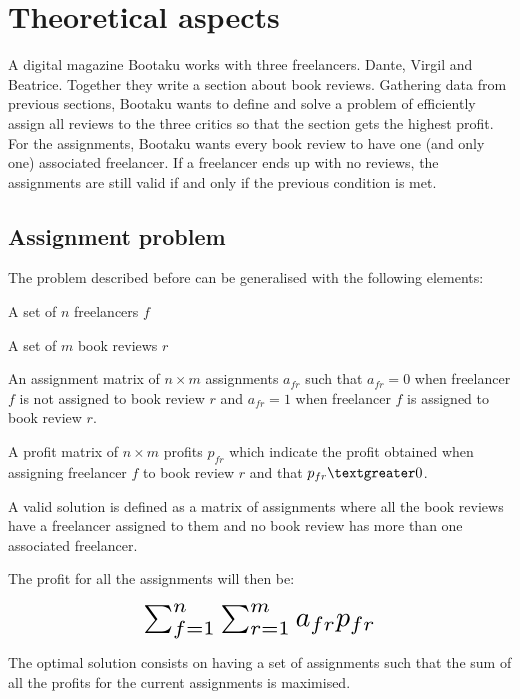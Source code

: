 \renewcommand{\documentname}{Theoretical Aspects}

\chapter{Theoretical aspects}\label{theory}

A digital magazine Bootaku works with three freelancers. Dante, Virgil and Beatrice. Together they write a section about book reviews. Gathering data from previous sections, Bootaku wants to define and solve a problem of efficiently assign all reviews to the three critics so that the section gets the highest profit. For the assignments, Bootaku wants every book review to have one (and only one) associated freelancer. If a freelancer ends up with no reviews, the assignments are still valid if and only if the previous condition is met.


\section{Assignment problem}

The problem described before can be generalised with the following elements: 

\begin{description}
    \item A set of $n$ freelancers $f$
    \item A set of $m$ book reviews $r$
    \item An assignment matrix of $n \times m$ assignments $a_{fr}$ such that $a_{fr} = 0$ when freelancer $f$ is not assigned to book review $r$ and $a_{fr} = 1$ when freelancer $f$ is assigned to book review $r$.
    \item A profit matrix of $n \times m$ profits $p_{fr}$ which indicate the profit obtained when assigning freelancer $f$ to book review $r$ and that $p_{fr} \textgreater 0$.
    \item A valid solution is defined as a matrix of assignments where all the book reviews have a freelancer assigned to them and no book review has more than one associated freelancer.
\end{description}

The profit for all the assignments will then be:

\begin{equation}
    \scalebox{2}{$\sum_{f=1}^n \sum_{r=1}^m a_{fr} p_{fr}$}
\end{equation}

The optimal solution consists on having a set of assignments such that the sum of all the profits for the current assignments is maximised.

